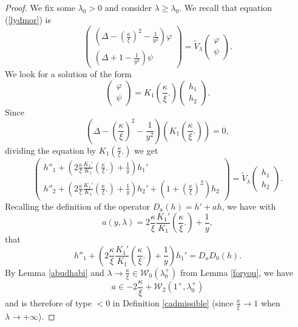 \documentclass[11 pt]{amsart}
\theoremstyle{definition}
\theoremstyle{remark}
\numberwithin{equation}{section}
\begin{document}
\begin{proof}
  We fix some $\lambda_0 > 0$ and consider $\lambda \geqslant \lambda_0$. We
  recall that equation (\ref{lydmor}) is
  \[ \left(\begin{array}{c}
       \left( \Delta - \left( \frac{\kappa}{\xi} \right)^2 - \frac{1}{y^2}
       \right) \varphi\\
       \left( \Delta + 1 - \frac{1}{y^2} \right) \psi
     \end{array}\right) = \widetilde{V}_{\lambda} \left(\begin{array}{c}
       \varphi\\
       \psi
     \end{array}\right) . \]
  We look for a solution of the form
  \[ \left(\begin{array}{c}
       \varphi\\
       \psi
     \end{array}\right) = K_1 \left( \frac{\kappa}{\xi} . \right)
     \left(\begin{array}{c}
       h_1\\
       h_2
     \end{array}\right) . \]
  Since
  \[ \left( \Delta - \left( \frac{\kappa}{\xi} \right)^2 - \frac{1}{y^2}
     \right) \left( K_1 \left( \frac{\kappa}{\xi} . \right) \right) = 0, \]
  dividing the equation by $K_1 \left( \frac{\kappa}{\xi} . \right)$ we get
  \begin{equation}
    \left(\begin{array}{c}
      h''_1 + \left( 2 \frac{\kappa}{\xi} \frac{K_1'}{K_1} \left(
      \frac{\kappa}{\xi} . \right) + \frac{1}{y} \right) h_1'\\
      h''_2 + \left( 2 \frac{\kappa}{\xi} \frac{K_1'}{K_1} \left(
      \frac{\kappa}{\xi} . \right) + \frac{1}{y} \right) h_2' + \left( 1 +
      \left( \frac{\kappa}{\xi} \right)^2 \right) h_2
    \end{array}\right) = \widetilde{V}_{\lambda} \left(\begin{array}{c}
      h_1\\
      h_2
    \end{array}\right) . \label{twoyardstone}
  \end{equation}
  Recalling the definition of the operator $D_a (h) = h' + a h$, we have with
  \[ a (y, \lambda) = 2 \frac{\kappa}{\xi} \frac{K_1'}{K_1} \left(
     \frac{\kappa}{\xi} . \right) + \frac{1}{y}, \]
  that
  \[ h''_1 + \left( 2 \frac{\kappa}{\xi} \frac{K_1'}{K_1} \left(
     \frac{\kappa}{\xi} . \right) + \frac{1}{y} \right) h_1' = D_a D_0 (h) .
  \]
  By Lemma \ref{abudhabi} and $\lambda \rightarrow \frac{\kappa}{\xi} \in
  \mathcal{W}_0 (\lambda_0^+)$ from Lemma \ref{foryou}, we have
  \[ a \in - 2 \frac{\kappa}{\xi} +\mathcal{W}_2 (1^+, \lambda_0^+) \]
  and is therefore of type $< 0$ in Definition \ref{cadmissible} (since
  $\frac{\kappa}{\xi} \rightarrow 1$ when $\lambda \rightarrow + \infty$).
  

\end{proof}
\end{document}
